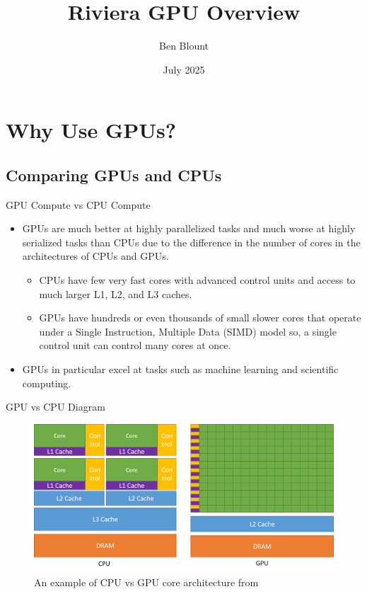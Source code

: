\documentclass[aspectratio=169]{beamer}
\title{Riviera GPU Overview}
\author{Ben Blount}
\institute{Data Science Research Institute}
\date{July 2025}
\begin{document}
\maketitleframe

\section{Why Use GPUs?}

\subsection{Comparing GPUs and CPUs}
\begin{frame}{GPU Compute vs CPU Compute}
	\begin{itemize}
		\item GPUs are much better at highly parallelized tasks and much worse at highly serialized tasks than CPUs due to the difference in the number of cores in the architectures of CPUs and GPUs.
		      \begin{itemize}
            \item CPUs have few very fast cores with advanced control units and access to much larger L1, L2, and L3 caches. \cite{gpuVsCpu}
            \item GPUs have hundreds or even thousands of small slower cores that operate under a Single Instruction, Multiple Data (SIMD) model so, a single control unit can control many cores at once. \cite{gpuVsCpu}
		      \end{itemize}
		\item GPUs in particular excel at tasks such as machine learning and scientific computing.
	\end{itemize}
\end{frame}

\begin{frame}{GPU vs CPU Diagram}
	\begin{figure}
		\centering
		\includegraphics[scale=.4]{figures/gpu-vs-cpu.png}
    \caption{An example of CPU vs GPU core architecture from \cite{nivdiaCuda}}
	\end{figure}
\end{frame}
\end{document}
